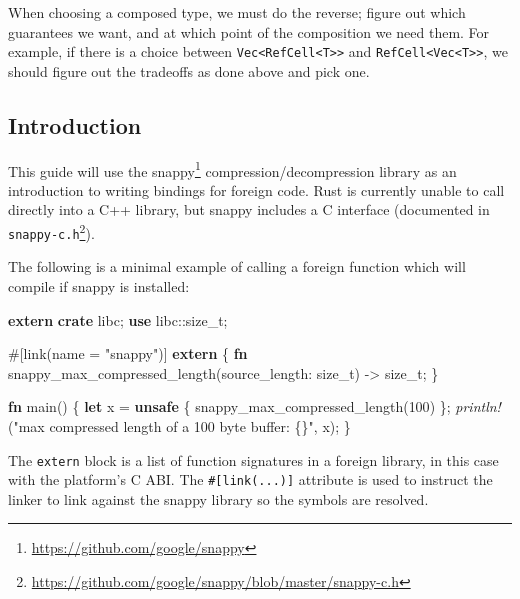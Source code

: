 \documentclass[a4paper,]{book}
\newenvironment{Shaded}{\begin{snugshade}}{\end{snugshade}}
\newcommand{\KeywordTok}[1]{\textcolor[rgb]{0.13,0.29,0.53}{\textbf{{#1}}}}
\newcommand{\DataTypeTok}[1]{\textcolor[rgb]{0.13,0.29,0.53}{{#1}}}
\newcommand{\DecValTok}[1]{\textcolor[rgb]{0.00,0.00,0.81}{{#1}}}
\newcommand{\StringTok}[1]{\textcolor[rgb]{0.31,0.60,0.02}{{#1}}}
\newcommand{\PreprocessorTok}[1]{\textcolor[rgb]{0.56,0.35,0.01}{\textit{{#1}}}}
\newcommand{\AttributeTok}[1]{\textcolor[rgb]{0.77,0.63,0.00}{{#1}}}
\newcommand{\NormalTok}[1]{{#1}}
\renewcommand{\href}[2]{#2\footnote{\url{#1}}}
\begin{document}
When choosing a composed type, we must do the reverse; figure out which
guarantees we want, and at which point of the composition we need them.
For example, if there is a choice between
\texttt{Vec\textless{}RefCell\textless{}T\textgreater{}\textgreater{}}
and
\texttt{RefCell\textless{}Vec\textless{}T\textgreater{}\textgreater{}},
we should figure out the tradeoffs as done above and pick one.


\subsection{Introduction}\label{introduction-1}

This guide will use the \href{https://github.com/google/snappy}{snappy}
compression/decompression library as an introduction to writing bindings
for foreign code. Rust is currently unable to call directly into a C++
library, but snappy includes a C interface (documented in
\href{https://github.com/google/snappy/blob/master/snappy-c.h}{\texttt{snappy-c.h}}).

The following is a minimal example of calling a foreign function which
will compile if snappy is installed:

\begin{Shaded}
\begin{Highlighting}[]
\KeywordTok{extern} \KeywordTok{crate} \NormalTok{libc;}
\KeywordTok{use} \NormalTok{libc::}\DataTypeTok{size_t}\NormalTok{;}

\AttributeTok{#[}\NormalTok{link}\AttributeTok{(}\NormalTok{name }\AttributeTok{=} \StringTok{"snappy"}\AttributeTok{)]}
\KeywordTok{extern} \NormalTok{\{}
    \KeywordTok{fn} \NormalTok{snappy_max_compressed_length(source_length: }\DataTypeTok{size_t}\NormalTok{) -> }\DataTypeTok{size_t}\NormalTok{;}
\NormalTok{\}}

\KeywordTok{fn} \NormalTok{main() \{}
    \KeywordTok{let} \NormalTok{x = }\KeywordTok{unsafe} \NormalTok{\{ snappy_max_compressed_length(}\DecValTok{100}\NormalTok{) \};}
    \PreprocessorTok{println!}\NormalTok{(}\StringTok{"max compressed length of a 100 byte buffer: \{\}"}\NormalTok{, x);}
\NormalTok{\}}
\end{Highlighting}
\end{Shaded}

The \texttt{extern} block is a list of function signatures in a foreign
library, in this case with the platform's C ABI. The
\texttt{\#{[}link(...){]}} attribute is used to instruct the linker to
link against the snappy library so the symbols are resolved.
\end{document}

